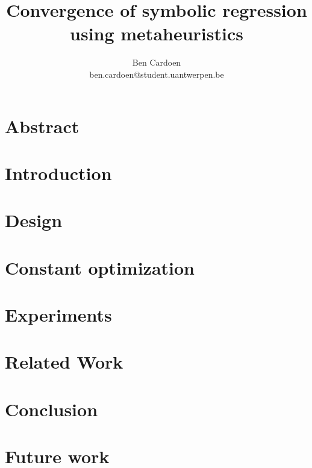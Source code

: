 \documentclass[]{article}
\title{Convergence of symbolic regression using metaheuristics
    }
\author{
    Ben Cardoen  \\
    ben.cardoen@student.uantwerpen.be
}
\begin{document}
    
    \maketitle
    \section{Abstract}
    
    \section{Introduction}
    
    \section{Design}\label{secdesign}
    
    \section{Constant optimization}
    
    \section{Experiments}\label{secexperiments}
    
    \section{Related Work}
    
    \section{Conclusion}
    
    \section{Future work}
    
    
    
    
\end{document}
